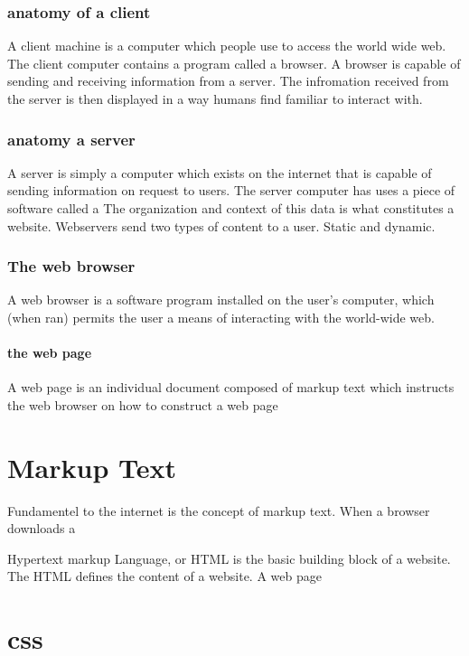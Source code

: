 {\subsection{anatomy of a client}

A client machine is a computer which people use to access the world wide web.  The client computer contains a program called a browser.  A browser is capable of sending and receiving information from a server.  The infromation received from the server is then displayed in a way humans find familiar to interact with.

\subsection{anatomy a server}

A server is simply a computer which exists on the internet that is capable of sending information on request to users.  The server computer has uses a piece of software called a   The organization and context of this data is what constitutes a website.  Webservers send two types of content to a user.  Static and dynamic.

\subsection{The web browser}

A web browser is a software program installed on the user's computer, which (when ran) permits the user a means of interacting with the world-wide web.  


\subsubsection{the web page}

A web page is an individual document composed of markup text which instructs the web browser on how to construct a web page

\chapter{Markup Text}

Fundamentel to the internet is the concept of markup text.  When a browser downloads a 

Hypertext markup Language, or HTML is the basic building block of a website.  The HTML defines the content of a website.  A web page 

\chapter{css}

}
